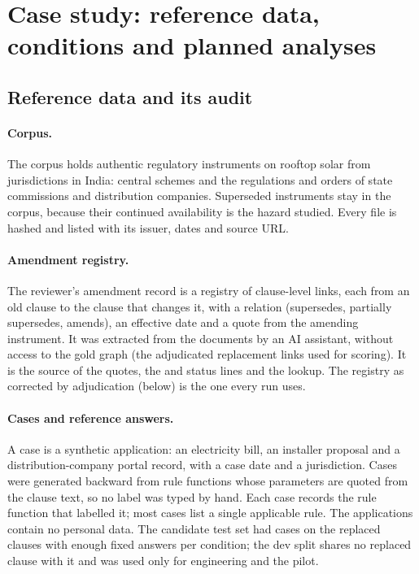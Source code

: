 \section{Case study: reference data, conditions and planned analyses}
\label{app:study1}

\subsection{Reference data and its audit}
\label{app:study1-data}
\paragraph{Corpus.}
The corpus holds \NCorpusDocs{} authentic regulatory instruments on rooftop solar from \NCorpusJurisdictions{}
jurisdictions in India: central schemes and the regulations and orders of state commissions and distribution
companies. Superseded instruments stay in the corpus, because their continued availability is the hazard studied.
Every file is hashed and listed with its issuer, dates and source URL.

\paragraph{Amendment registry.}
The reviewer's amendment record is a registry of \NLinksRegistry{} clause-level links, each from an old clause to the
clause that changes it, with a relation (supersedes, partially supersedes, amends), an effective date and a quote from
the amending instrument. It was extracted from the documents by an AI assistant, without access to the gold graph (the
adjudicated replacement links used for scoring). It is the source of the  quotes, the  and  status lines and the 
lookup. The registry as corrected by adjudication (below) is the one every run uses.

\paragraph{Cases and reference answers.}
A case is a synthetic application: an electricity bill, an installer proposal and a distribution-company portal record,
with a case date and a jurisdiction. Cases were generated backward from rule functions whose parameters are quoted from
the clause text, so no label was typed by hand. Each case records the rule function that labelled it; most cases list a
single applicable rule. The applications contain no personal data. The candidate test set had \NCandidateCases{} cases
on the replaced clauses with enough fixed answers per condition; the dev split shares no replaced clause with it and was
used only for engineering and the pilot.

